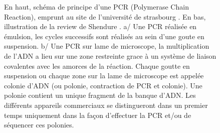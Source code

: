 \documentclass[a4paper,11pt]{article}
\begin{document}
\begin{figure}[H]
\begin{center}
\caption{En haut, schéma de principe d'une PCR (Polymerase Chain Reaction), emprunt au site de l'université de strasbourg \cite{pcrjpg}. En bas, illustration de la review de Shendure \cite{Shendure2008}. a/ Une PCR réalisée en émulsion, les cycles successifs sont réalisés au sein d'une goute en suspension. b/ Une PCR sur lame de microscope, la multiplication de l'ADN a lieu sur une zone restreinte grace à un système de liaison covalentes avec les amorces de la réaction. Chaque goutte en suspension ou chaque zone sur la lame de microscope est appelée colonie d'ADN (ou polonie, contraction de PCR et colonie). Une polonie contient un unique fragment de la banque d'ADN. Les différents appareils commerciaux se distingueront dans un premier temps uniquement dans la façon d'effectuer la PCR et/ou de séquencer ces polonies.}
\label{pcr}
\end{center}
\end{figure}
\end{document}

